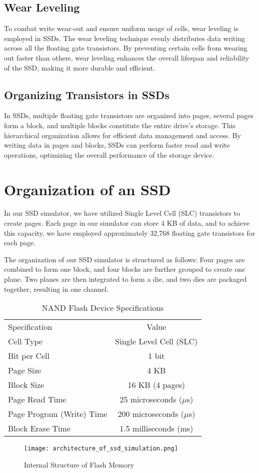\documentclass[conference]{/home/habib/Desktop/flash_ssd_simulator_web/paper_writing/latex_file/IEEEtran}
\begin{document}
\subsection{Wear Leveling}
To combat write wear-out and ensure uniform usage of cells, wear leveling is employed in SSDs. The wear leveling technique evenly distributes data writing across all the floating gate transistors. By preventing certain cells from wearing out faster than others, wear leveling enhances the overall lifespan and reliability of the SSD, making it more durable and efficient.

\subsection{Organizing Transistors in SSDs}
In SSDs, multiple floating gate transistors are organized into pages, several pages form a block, and multiple blocks constitute the entire drive's storage. This hierarchical organization allows for efficient data management and access. By writing data in pages and blocks, SSDs can perform faster read and write operations, optimizing the overall performance of the storage device.


\section{Organization of an SSD}
In our SSD simulator, we have utilized Single Level Cell (SLC) transistors to create pages. Each page in our simulator can store 4 KB of data, and to achieve this capacity, we have employed approximately 32,768 floating gate transistors for each page.

The organization of our SSD simulator is structured as follows: Four pages are combined to form one block, and four blocks are further grouped to create one plane. Two planes are then integrated to form a die, and two dies are packaged together, resulting in one channel.

\begin{table}[htbp]
    \centering
    \caption{NAND Flash Device Specifications}
    \begin{tabular}{l c}
        Specification & Value \\
        Cell Type & Single Level Cell (SLC) \\
        Bit per Cell & 1 bit \\
        Page Size & 4 KB \\
        Block Size & 16 KB (4 pages) \\
        Page Read Time & 25 microseconds ($\mu$s) \\
        Page Program (Write) Time & 200 microseconds ($\mu$s) \\
        Block Erase Time & 1.5 milliseconds (ms) \\
    \end{tabular}
\end{table}
\begin{figure}[h]
    \centering
    \texttt{[image: architecture\_of\_ssd\_simulation.png]}
    \caption{Internal Structure of Flash Memory}
    \label{fig:architecture_of_ssd_simulation}
\end{figure}
\end{document}
